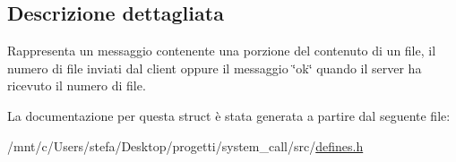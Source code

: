 \subsection{Descrizione dettagliata}
Rappresenta un messaggio contenente una porzione del contenuto di un file, il numero di file inviati dal client oppure il messaggio \char`\"{}ok\char`\"{} quando il server ha ricevuto il numero di file. 

La documentazione per questa struct è stata generata a partire dal seguente file\+:\begin{DoxyCompactItemize}
\item 
/mnt/c/\+Users/stefa/\+Desktop/progetti/system\+\_\+call/src/\hyperlink{defines_8h}{defines.\+h}\end{DoxyCompactItemize}
